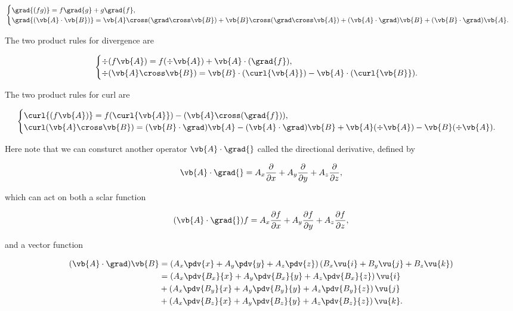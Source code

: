 \documentclass[english,a4paper,12pt]{report}
\begin{document}
\begin{equation}
\begin{cases} 
	\grad{(fg)} = f\grad{g} + g\grad{f},  \\
	\grad{(\vb{A} \cdot \vb{B})} = \vb{A} \cross (\grad \cross \vb{B}) + \vb{B} \cross (\grad \cross \vb{A}) + (\vb{A} \cdot \grad)\vb{B} + (\vb{B} \cdot \grad)\vb{A}. 
\end{cases}
\end{equation}
	
The two product rules for divergence are 

\begin{equation}
\begin{cases} 
	\div{(f\vb{A})} = f(\div{\vb{A}}) + \vb{A} \cdot (\grad{f}), \\
	\div (\vb{A} \cross \vb{B}) = \vb{B} \cdot (\curl {\vb{A}}) - \vb{A} \cdot (\curl{\vb{B}}). 
\end{cases}
\end{equation}

	
The two product rules for curl are
	
\begin{equation}
\begin{cases} 
	\curl{(f\vb{A})} = f(\curl{\vb{A}}) - (\vb{A} \cross (\grad{f})), \\
	\curl (\vb{A} \cross \vb{B}) = (\vb{B} \cdot \grad)\vb{A} - (\vb{A} \cdot \grad)\vb{B} + \vb{A}(\div{\vb{A}}) - \vb{B}(\div{\vb{A}}). 
\end{cases}
\end{equation}

	
Here note that we can consturct another operator \(\vb{A} \cdot \grad{}  \)  called the directional derivative, defined by 

\begin{equation}
	\vb{A} \cdot \grad{} = A_{x} \frac{\partial }{\partial x} + A_{y} \frac{\partial }{\partial y} + A_{z} \frac{\partial }{\partial z},
\end{equation}

which can act on both a sclar function 

\begin{equation}
	(\vb{A} \cdot \grad{} )f = A_{x} \frac{\partial f}{\partial x} + A_{y} \frac{\partial f}{\partial y} + A_{z} \frac{\partial f}{\partial z},
\end{equation}

and a vector function

\begin{equation} 
	\begin{aligned} 
		(\vb{A} \cdot \grad) \vb{B} &= \left(A_x\pdv{x} + A_y\pdv{y} + A_z\pdv{z}\right)\left(B_x\vu{i} + B_y\vu{j} + B_z\vu{k}\right) \\ &= \left(A_x\pdv{B_x}{x} + A_y\pdv{B_x}{y} + A_z\pdv{B_x}{z}\right)\vu{i} \\ &+ \left(A_x\pdv{B_y}{x} + A_y\pdv{B_y}{y} + A_z\pdv{B_y}{z}\right)\vu{j} \\ &+ \left(A_x\pdv{B_z}{x} + A_y\pdv{B_z}{y} + A_z\pdv{B_z}{z}\right)\vu{k}.
	\end{aligned} 
\end{equation}
\end{document}
